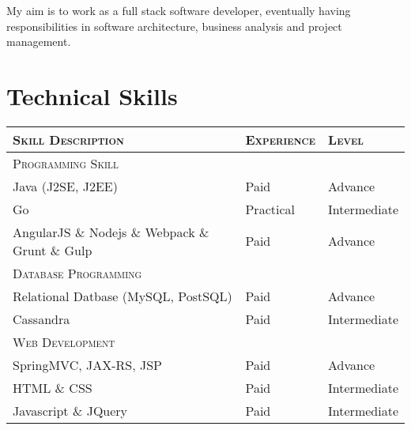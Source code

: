 \documentclass[a4paper,10pt]{article} %
\begin{document}
My aim is to work as a full stack software developer, eventually having responsibilities in software architecture, business analysis and project management.


\section{Technical Skills}

    \begin{tabular}{l|l|l}
   
    \textsc{Skill Description} & \textsc{Experience}  & \textsc{Level} \\ \hline
    \textsc{Programming Skill}\\ \hline
    Java (J2SE, J2EE) & Paid & Advance \\
    Go & Practical & Intermediate \\
    AngularJS \& Nodejs \& Webpack \& Grunt \& Gulp & Paid & Advance \\
    \hline 
    \textsc{Database Programming} \\ \hline
    Relational Datbase (MySQL, PostSQL) & Paid & Advance \\ 
    Cassandra & Paid & Intermediate \\ \hline
    \textsc{Web Development} \\ \hline
    SpringMVC, JAX-RS, JSP & Paid & Advance \\ 
    HTML \& CSS & Paid & Intermediate \\ 
    Javascript \& JQuery & Paid & Intermediate \\

\end{tabular}
\end{document}
